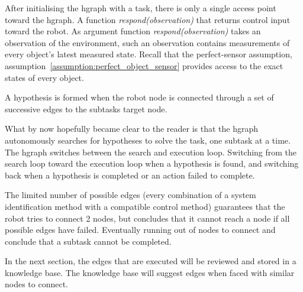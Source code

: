 After initialising the \ac{hgraph} with a task, there is only a single access point toward the \ac{hgraph}. A function \textit{respond(observation)} that returns control input toward the robot. As argument function \textit{respond(observation)} takes an observation of the environment, such an observation contains measurements of every object's latest measured state. Recall that the perfect-sensor assumption, assumption~\ref{assumption:perfect_object_sensor} provides access to the exact states of every object.\bs
{}

 A hypothesis is formed when the robot node is connected through a set of successive edges to the subtasks target node.



What by now hopefully became clear to the reader is that the \ac{hgraph} autonomously searches for hypotheses to solve the task, one subtask at a time. The \ac{hgraph} switches between the search and execution loop. Switching from the search loop toward the execution loop when a hypothesis is found, and switching back when a hypothesis is completed or an action failed to complete.\bs

The limited number of possible edges (every combination of a system identification method with a compatible control method) guarantees that the robot tries to connect 2 nodes, but concludes that it cannot reach a node if all possible edges have failed. Eventually running out of nodes to connect and conclude that a subtask cannot be completed.\bs

In the next section, the edges that are executed will be reviewed and stored in a knowledge base. The knowledge base will suggest edges when faced with similar nodes to connect.
